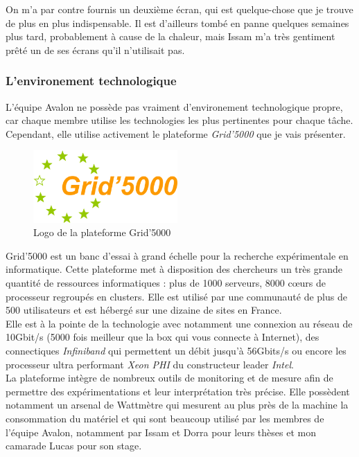 On m'a par contre fournis un deuxième écran, qui est quelque-chose que je trouve de plus en plus indispensable. Il est d'ailleurs tombé en panne quelques semaines plus tard, probablement à cause de la chaleur, mais Issam m'a très gentiment prêté un de ses écrans qu'il n'utilisait pas.

\subsubsection{L'environement technologique}
L'équipe Avalon ne possède pas vraiment d'environement technologique propre, car chaque membre utilise les technologies les plus pertinentes pour chaque tâche. Cependant, elle utilise activement le plateforme \emph{Grid'5000} que je vais présenter.\\

\begin{figure}[h!]
	\centering
	\includegraphics[width=5.5cm]{partie1/images/grid5000_logo.png}
	\caption{Logo de la plateforme Grid'5000}
\end{figure}

Grid'5000 est un banc d'essai à grand échelle pour la recherche expérimentale en informatique. Cette plateforme met à disposition des chercheurs un très grande quantité de ressources informatiques : plus de 1000 serveurs, 8000 cœurs de processeur regroupés en \glspl{cluster}. Elle est utilisé par une communauté de plus de 500 utilisateurs et est hébergé sur une dizaine de sites en France. \cite{grid5000home}\\

Elle est à la pointe de la technologie avec notamment une connexion au réseau de 10Gbit/s (5000 fois meilleur que la box qui vous connecte à Internet), des connectiques \emph{Infiniband} qui permettent un débit jusqu'à 56Gbits/s ou encore les processeur ultra performant \emph{Xeon PHI} du constructeur leader \emph{Intel}.\\

La plateforme intègre de nombreux outils de monitoring et de mesure afin de permettre des expérimentations et leur interprétation très précise. Elle possèdent notamment un arsenal de Wattmètre qui mesurent au plus près de la machine la consommation du matériel et qui sont beaucoup utilisé par les membres de l'équipe Avalon, notamment par Issam et Dorra pour leurs thèses et mon camarade Lucas pour son stage.\\

